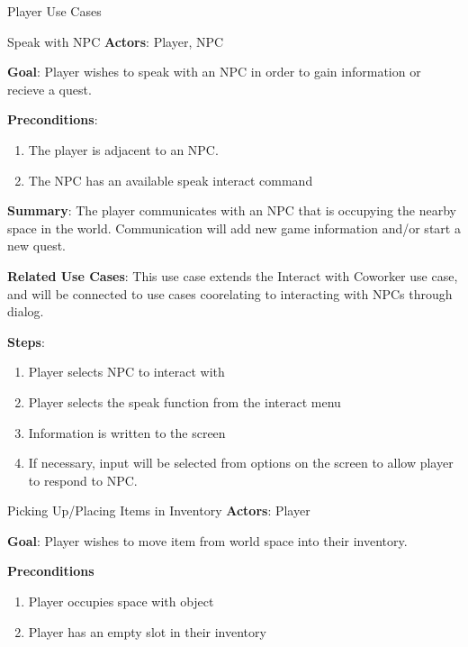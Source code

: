 \documentclass[12pt]{report}
\begin{document}
  \begin{section}{Player Use Cases}
    \begin{subsection}{Speak with NPC}
      \textbf{Actors}:
      Player, NPC

      \textbf{Goal}:
      Player wishes to speak with an NPC in order to gain information or recieve 
      a quest.

      \textbf{Preconditions}:
      \begin{enumerate}
        \item The player is adjacent to an NPC.
        \item The NPC has an available speak interact command
      \end{enumerate}

      \textbf{Summary}:
      The player communicates with an NPC that is occupying the nearby space 
      in the world. Communication will add new game information and/or start
      a new quest.

      \textbf{Related Use Cases}:
      This use case extends the Interact with Coworker use case, and will be 
      connected to use cases coorelating to interacting with NPCs through 
      dialog.

      \textbf{Steps}:
      \begin{enumerate}
        \item Player selects NPC to interact with
        \item Player selects the speak function from the interact menu
        \item Information is written to the screen
        \item If necessary, input will be selected from options on the screen
	      to allow player to respond to NPC.
      \end{enumerate}
    \end{subsection}



    \begin{subsection}{Picking Up/Placing Items in Inventory}
      \textbf{Actors}:
      Player

      \textbf{Goal}:
      Player wishes to move item from world space into their inventory.

      \textbf{Preconditions}
      \begin{enumerate}
        \item Player occupies space with object
        \item Player has an empty slot in their inventory
      \end{enumerate}


\end{subsection}
\end{section}
\end{document}
